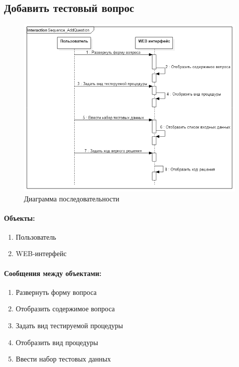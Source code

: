 \documentclass{article}
\begin{document}
    \subsection{Добавить тестовый вопрос}
        \begin{figure}[H]
            \includegraphics[width=\textwidth, center]{Sequence_AddQuestion}
            \caption{Диаграмма последовательности}
        \end{figure}
        \paragraph{Объекты:}
        \begin{enumerate}
            \item Пользователь
            \item WEB-интерфейс
        \end{enumerate}
        \paragraph{Сообщения между объектами:}
        \begin{enumerate}
            \item Развернуть форму вопроса
            \item Отобразить содержимое вопроса
            \item Задать вид тестируемой процедуры
            \item Отобразить вид процедуры        
            \item Ввести набор тестовых данных        
        \end{enumerate}
\end{document}
